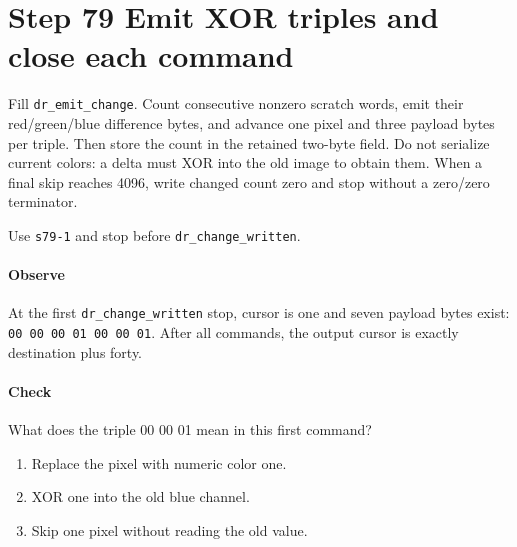 \section{Step 79 Emit XOR triples and close each command}
Fill \texttt{dr\_emit\_change}. Count consecutive nonzero scratch words, emit their red/green/blue difference bytes, and advance one pixel and three payload bytes per triple. Then store the count in the retained two-byte field. Do not serialize current colors: a delta must XOR into the old image to obtain them. When a final skip reaches 4096, write changed count zero and stop without a zero/zero terminator.

Use \texttt{s79-1} and stop before \texttt{dr\_change\_written}.

\paragraph{Observe} At the first \texttt{dr\_change\_written} stop, cursor is one and seven payload bytes exist: \texttt{00 00 00 01 00 00 01}. After all commands, the output cursor is exactly destination plus forty.

\paragraph{Check} What does the triple 00 00 01 mean in this first command?
\begin{enumerate}[label=\Alph*.]
  \item Replace the pixel with numeric color one.
  \item XOR one into the old blue channel.
  \item Skip one pixel without reading the old value.
\end{enumerate}
